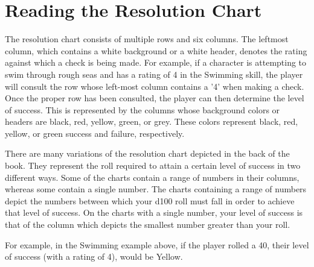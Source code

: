 \documentclass[oneside]{book}
\begin{document}
\section{Reading the Resolution Chart}
The resolution chart consists of multiple rows and six columns. The leftmost column, which contains a white background or a white header, denotes the rating against which a check is being made. For example, if a character is attempting to swim through rough seas and has a rating of 4 in the Swimming skill, the player will consult the row whose left-most column contains a '4' when making a check. Once the proper row has been consulted, the player can then determine the level of success. This is represented by the columns whose background colors or headers are black, red, yellow, green, or grey. These colors represent black, red, yellow, or green success and failure, respectively. 

There are many variations of the resolution chart depicted in the back of the book. They represent the roll required to attain a certain level of success in two different ways. Some of the charts contain a range of numbers in their columns, whereas some contain a single number. The charts containing a range of numbers depict the numbers between which your d100 roll must fall in order to achieve that level of success. On the charts with a single number, your level of success is that of the column which depicts the smallest number greater than your roll. 

For example, in the Swimming example above, if the player rolled a 40, their level of success (with a rating of 4), would be Yellow.
\end{document}
